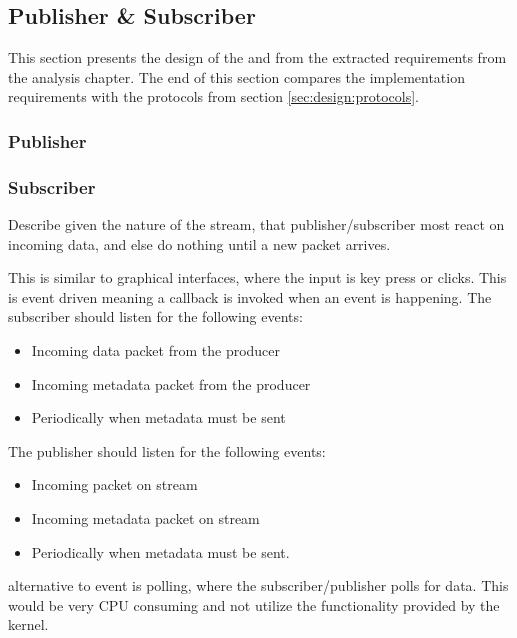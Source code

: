 



\subsection{Publisher \& Subscriber}
This section presents the design of the  and  from the extracted requirements from the analysis chapter. The end of this section compares the implementation requirements with the protocols from section \ref{sec:design:protocols}.

\subsubsection{Publisher}

\subsubsection{Subscriber}

Describe given the nature of the stream, that publisher/subscriber most react on incoming data, and else do nothing until a new packet arrives.

This is similar to graphical interfaces, where the input is key press or clicks. This is event driven meaning a callback is invoked when an event is happening.
The subscriber should listen for the following events:
\begin{itemize}
	\item Incoming data packet from the producer
	\item Incoming metadata packet from the producer
	\item Periodically when metadata must be sent
\end{itemize}

The publisher should listen for the following events:
\begin{itemize}
	\item Incoming packet on stream
	\item Incoming metadata packet on stream
	\item Periodically when metadata must be sent.
\end{itemize}

alternative to event is polling, where the subscriber/publisher polls for data. This would be very CPU consuming and not utilize the functionality provided by the kernel.


